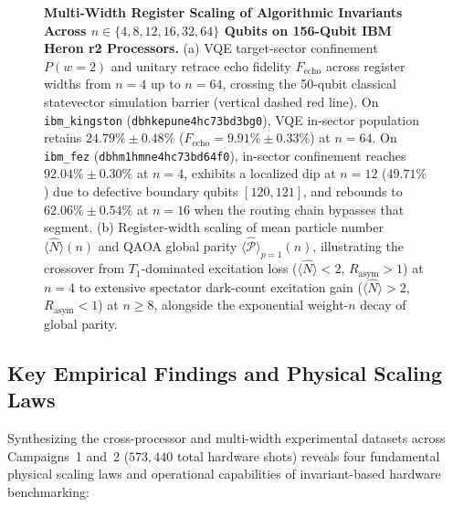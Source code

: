 \documentclass[aps,pra,reprint,superscriptaddress,floatfix,nofootinbib]{revtex4-2}
\begin{document}
\begin{figure}[t]
{\begin{tikzpicture}[
    font=\small,
    every node/.style={inner sep=0pt}
]
\end{tikzpicture}%
}
\caption{\textbf{Multi-Width Register Scaling of Algorithmic Invariants Across $n \in \{4, 8, 12, 16, 32, 64\}$ Qubits on 156-Qubit IBM Heron r2 Processors.}
(a) VQE target-sector confinement $P(w=2)$ and unitary retrace echo fidelity $F_{\text{echo}}$ across register widths from $n = 4$ up to $n = 64$, crossing the 50-qubit classical statevector simulation barrier (vertical dashed red line). On \texttt{ibm\_kingston} (\texttt{dbhkepune4hc73bd3bg0}), VQE in-sector population retains $24.79\% \pm 0.48\%$ ($F_{\text{echo}} = 9.91\% \pm 0.33\%$) at $n = 64$. On \texttt{ibm\_fez} (\texttt{dbhm1hmne4hc73bd64f0}), in-sector confinement reaches $92.04\% \pm 0.30\%$ at $n = 4$, exhibits a localized dip at $n = 12$ ($49.71\%$) due to defective boundary qubits $[120, 121]$, and rebounds to $62.06\% \pm 0.54\%$ at $n = 16$ when the routing chain bypasses that segment.
(b) Register-width scaling of mean particle number $\langle \hat{N} \rangle(n)$ and QAOA global parity $\langle \hat{\mathcal{P}} \rangle_{p=1}(n)$, illustrating the crossover from $T_1$-dominated excitation loss ($\langle \hat{N} \rangle < 2$, $R_{\text{asym}} > 1$) at $n = 4$ to extensive spectator dark-count excitation gain ($\langle \hat{N} \rangle > 2$, $R_{\text{asym}} < 1$) at $n \ge 8$, alongside the exponential weight-$n$ decay of global parity.}
\label{fig:scaling_results}
\end{figure}

\subsection{Key Empirical Findings and Physical Scaling Laws}
\label{sec:findings}
Synthesizing the cross-processor and multi-width experimental datasets across Campaigns~1 and~2 ($573,440$ total hardware shots) reveals four fundamental physical scaling laws and operational capabilities of invariant-based hardware benchmarking:
\end{document}
